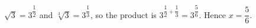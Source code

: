 $\sqrt3=3^{\dfrac{1}{2}}$ and $\sqrt[3]3=3^{\dfrac{1}{3}}$, so the product is $3^{\dfrac{1}{2}+\dfrac{1}{3}}=3^{\dfrac{5}{6}}$. Hence $x=\boxed{\dfrac{5}{6}}$.
